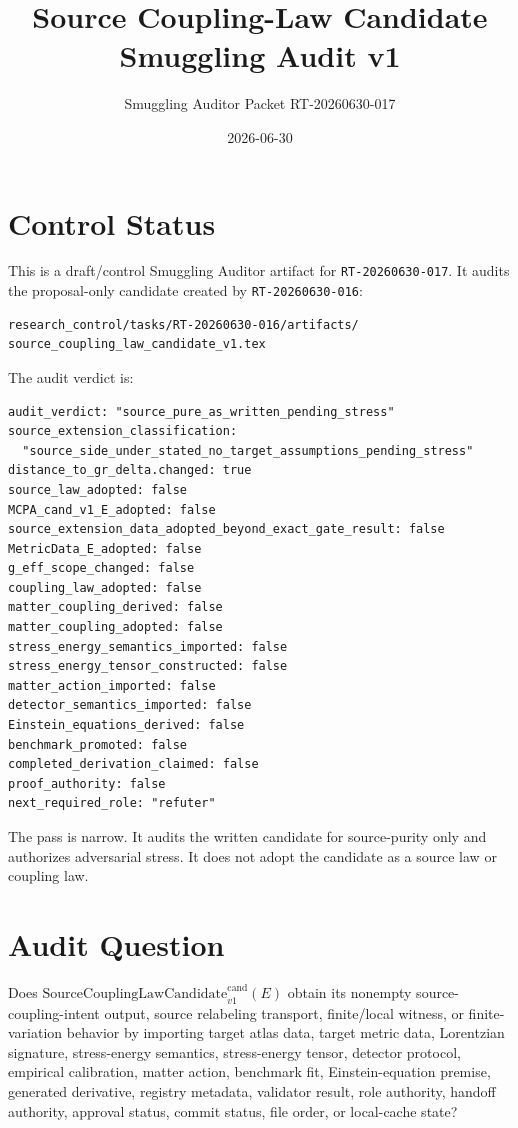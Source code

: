 \documentclass[11pt]{article}
\title{Source Coupling-Law Candidate Smuggling Audit v1}
\author{Smuggling Auditor Packet RT-20260630-017}
\date{2026-06-30}
\newcommand{\SourceCoupCand}{\mathrm{SourceCouplingLawCandidate}^{\mathrm{cand}}_{v1}}
\begin{document}
\maketitle

\section{Control Status}

This is a draft/control Smuggling Auditor artifact for
\texttt{RT-20260630-017}. It audits the proposal-only candidate created by
\texttt{RT-20260630-016}:
\begin{verbatim}
research_control/tasks/RT-20260630-016/artifacts/
source_coupling_law_candidate_v1.tex
\end{verbatim}

The audit verdict is:
\begin{verbatim}
audit_verdict: "source_pure_as_written_pending_stress"
source_extension_classification:
  "source_side_under_stated_no_target_assumptions_pending_stress"
distance_to_gr_delta.changed: true
source_law_adopted: false
MCPA_cand_v1_E_adopted: false
source_extension_data_adopted_beyond_exact_gate_result: false
MetricData_E_adopted: false
g_eff_scope_changed: false
coupling_law_adopted: false
matter_coupling_derived: false
matter_coupling_adopted: false
stress_energy_semantics_imported: false
stress_energy_tensor_constructed: false
matter_action_imported: false
detector_semantics_imported: false
Einstein_equations_derived: false
benchmark_promoted: false
completed_derivation_claimed: false
proof_authority: false
next_required_role: "refuter"
\end{verbatim}

The pass is narrow. It audits the written candidate for source-purity only
and authorizes adversarial stress. It does not adopt the candidate as a source
law or coupling law.

\section{Audit Question}

Does \(\SourceCoupCand(E)\) obtain its nonempty source-coupling-intent output,
source relabeling transport, finite/local witness, or finite-variation
behavior by importing target atlas data, target metric data, Lorentzian
signature, stress-energy semantics, stress-energy tensor, detector protocol,
empirical calibration, matter action, benchmark fit, Einstein-equation
premise, generated derivative, registry metadata, validator result, role
authority, handoff authority, approval status, commit status, file order, or
local-cache state?
\end{document}
